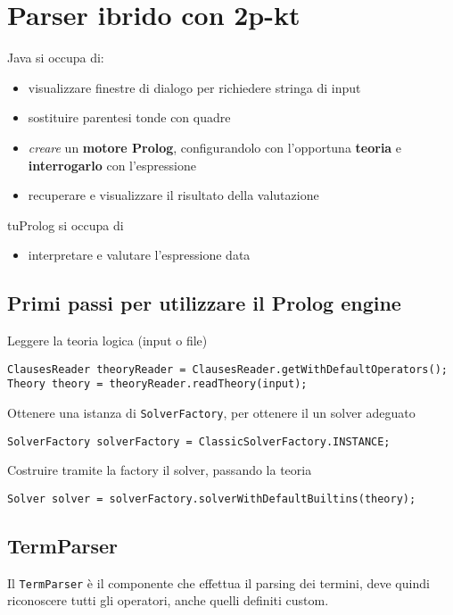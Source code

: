 \section{Parser ibrido con 2p-kt}
Java si occupa di:
\begin{itemize}
    \item visualizzare finestre di dialogo per richiedere stringa di input
    \item sostituire parentesi tonde con quadre
    \item \textit{creare} un \textbf{motore Prolog}, configurandolo con l'opportuna \textbf{teoria} e \textbf{interrogarlo} con l'espressione
    \item recuperare e visualizzare il risultato della valutazione
\end{itemize}
tuProlog si occupa di
\begin{itemize}
    \item interpretare e valutare l'espressione data
\end{itemize}

\subsection{Primi passi per utilizzare il Prolog engine}

Leggere la teoria logica (input o file)
\begin{verbatim}
ClausesReader theoryReader = ClausesReader.getWithDefaultOperators();
Theory theory = theoryReader.readTheory(input);
\end{verbatim}

Ottenere una istanza di \texttt{SolverFactory}, per ottenere il un solver adeguato
\begin{verbatim}
SolverFactory solverFactory = ClassicSolverFactory.INSTANCE;
\end{verbatim}

Costruire tramite la factory il solver, passando la teoria
\begin{verbatim}
Solver solver = solverFactory.solverWithDefaultBuiltins(theory);
\end{verbatim}

\subsection{TermParser}
Il \texttt{TermParser} è il componente che effettua il parsing dei termini, deve quindi riconoscere tutti gli operatori, anche quelli definiti custom.

